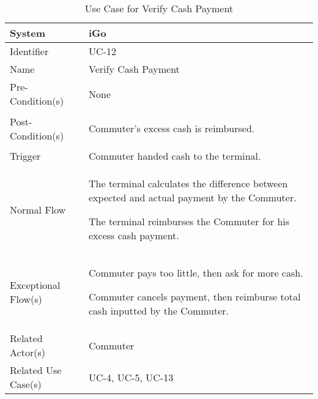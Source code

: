 \begin{table}[ht]
    \centering
    \begin{tabular}{|l|p{11cm}|}
        \hline
        System             & iGo\\
        \hline
        Identifier         & UC-12 \\
        \hline
        Name               & Verify Cash Payment \\
        \hline
        Pre-Condition(s)   & None \\
        \hline
        Post-Condition(s)  & 
        \begin{enumerate*}[itemjoin=\newline]
            \item Commuter's excess cash is reimbursed.
        \end{enumerate*} \\
        \hline
        Trigger            & Commuter handed cash to the terminal. \\
        \hline
        Normal Flow        & 
        \begin{enumerate*}[itemjoin=\newline]
            \item The terminal calculates the difference between expected and actual payment by the Commuter.
            \item The terminal reimburses the Commuter for his excess cash payment.
        \end{enumerate*} \\
        \hline
        Exceptional Flow(s)& 
        \begin{enumerate*}[itemjoin=\newline]
            \item Commuter pays too little, then ask for more cash.
            \item Commuter cancels payment, then reimburse total cash inputted by the Commuter.
        \end{enumerate*} \\
        \hline
        Related Actor(s)   & Commuter\\
        \hline
        Related Use Case(s)& UC-4, UC-5, UC-13\\
        \hline
    \end{tabular}
    \caption{Use Case for Verify Cash Payment}
    \label{tab:UC_VerifyCashPayment}
\end{table}


